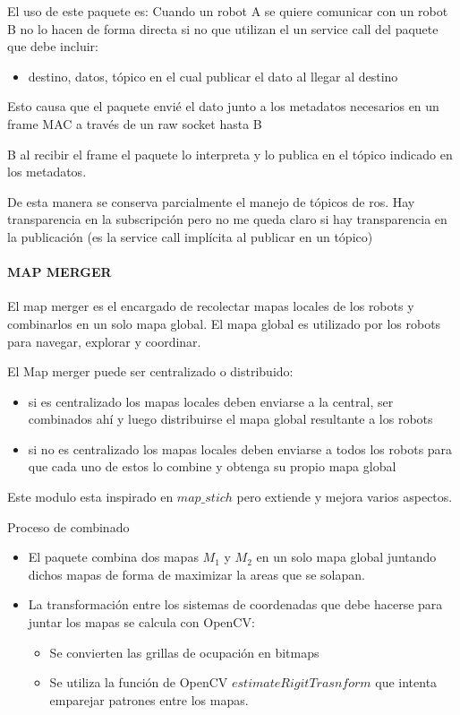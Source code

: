El uso de este paquete es:
Cuando un robot A se quiere comunicar con un robot B no lo hacen de forma directa si no que utilizan el un service call del paquete que debe incluir:
\begin{itemize}
  \item destino, datos, tópico en el cual publicar el dato al llegar al destino
\end{itemize}

Esto causa que el paquete envié el dato junto a los metadatos necesarios en un frame MAC a través de un raw socket hasta B

B al recibir el frame el paquete lo interpreta y lo publica en el tópico indicado en los metadatos.

De esta manera se conserva parcialmente el manejo de tópicos de ros. Hay transparencia en la subscripción pero no me queda claro si hay transparencia en la publicación (es la service call implícita al publicar en un tópico)

\paragraph{MAP MERGER}

El map merger es el encargado de recolectar mapas locales de los robots y combinarlos en un solo mapa global. El mapa global es utilizado por los robots para navegar, explorar y coordinar.

El Map merger puede ser centralizado o distribuido:
\begin{itemize}
\item si es centralizado los mapas locales deben enviarse a la central, ser combinados ahí y luego distribuirse el mapa global resultante a los robots
\item si no es centralizado los mapas locales deben enviarse a todos los robots para que cada uno de estos lo combine y obtenga su propio mapa global
\end{itemize}

Este modulo esta inspirado en $map\_stich$ pero extiende y mejora varios aspectos.

Proceso de combinado
\begin{itemize}
  \item El paquete combina dos mapas $M_1$ y $M_2$ en un solo mapa global juntando dichos mapas de forma de maximizar la areas que se solapan.

  \item La transformación entre los sistemas de coordenadas que debe hacerse para juntar los mapas se calcula con OpenCV:
  \begin{itemize}
    \item Se convierten las grillas de ocupación en bitmaps
    \item Se utiliza la función de OpenCV $estimateRigitTrasnform$ que intenta emparejar patrones entre los mapas.
  \end{itemize}
\end{itemize}

